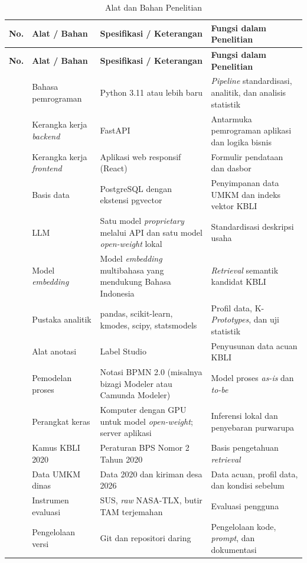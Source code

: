 \documentclass[12pt,a4paper]{report}
\begin{document}
{\footnotesize
\setlength{\tabcolsep}{4pt}
\renewcommand{\arraystretch}{1.15}
\begin{longtable}{|>{\centering\arraybackslash}p{}|L{0.24\textwidth}|L{0.30\textwidth}|L{0.32\textwidth}|}
\caption{Alat dan Bahan Penelitian}
\label{tab:tools}\\
\hline
\textbf{No.} & \textbf{Alat / Bahan} & \textbf{Spesifikasi / Keterangan} & \textbf{Fungsi dalam Penelitian} \\ \hline
\endfirsthead
\hline
\textbf{No.} & \textbf{Alat / Bahan} & \textbf{Spesifikasi / Keterangan} & \textbf{Fungsi dalam Penelitian} \\ \hline
{} & Bahasa pemrograman & Python 3.11 atau lebih baru & \textit{Pipeline} standardisasi, analitik, dan analisis statistik \\  & Kerangka kerja \textit{backend} & FastAPI & Antarmuka pemrograman aplikasi dan logika bisnis \\  & Kerangka kerja \textit{frontend} & Aplikasi web responsif (React) & Formulir pendataan dan dasbor \\  & Basis data & PostgreSQL dengan ekstensi pgvector & Penyimpanan data UMKM dan indeks vektor KBLI \\  & LLM & Satu model \textit{proprietary} melalui API dan satu model \textit{open-weight} lokal & Standardisasi deskripsi usaha \\  & Model \textit{embedding} & Model \textit{embedding} multibahasa yang mendukung Bahasa Indonesia & \textit{Retrieval} semantik kandidat KBLI \\  & Pustaka analitik & pandas, scikit-learn, kmodes, scipy, statsmodels & Profil data, K-\textit{Prototypes}, dan uji statistik \\  & Alat anotasi & Label Studio & Penyusunan data acuan KBLI \\  & Pemodelan proses & Notasi BPMN 2.0 (misalnya bizagi Modeler atau Camunda Modeler) & Model proses \textit{as-is} dan \textit{to-be} \\  & Perangkat keras & Komputer dengan GPU untuk model \textit{open-weight}; server aplikasi & Inferensi lokal dan penyebaran purwarupa \\  & Kamus KBLI 2020 & Peraturan BPS Nomor 2 Tahun 2020 \cite{bps2020kbli} & Basis pengetahuan \textit{retrieval} \\  & Data UMKM dinas & Data 2020 dan kiriman desa 2026 & Data acuan, profil data, dan kondisi sebelum \\  & Instrumen evaluasi & SUS, \textit{raw} NASA-TLX, butir TAM terjemahan & Evaluasi pengguna \\  & Pengelolaan versi & Git dan repositori daring & Pengelolaan kode, \textit{prompt}, dan dokumentasi \\ \hline
\end{longtable}
}
\end{document}

